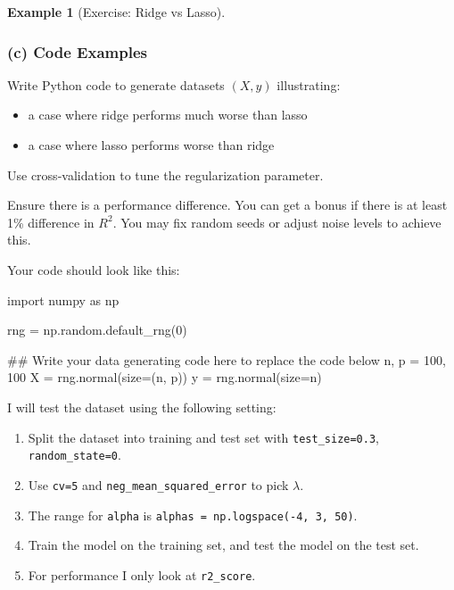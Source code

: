 \documentclass[
  english,
]{article}
\newenvironment{Shaded}{\begin{snugshade}}{\end{snugshade}}
\newcommand{\CommentTok}[1]{\textcolor[rgb]{0.37,0.37,0.37}{#1}}
\newcommand{\DecValTok}[1]{\textcolor[rgb]{0.68,0.00,0.00}{#1}}
\newcommand{\ImportTok}[1]{\textcolor[rgb]{0.00,0.46,0.62}{#1}}
\newcommand{\NormalTok}[1]{\textcolor[rgb]{0.00,0.23,0.31}{#1}}
\newcommand{\OperatorTok}[1]{\textcolor[rgb]{0.37,0.37,0.37}{#1}}
\providecommand{\tightlist}{%
  \setlength{\itemsep}{0pt}\setlength{\parskip}{0pt}}
\theoremstyle{definition}
\newtheorem{example}{Example}[section]
\theoremstyle{definition}
\theoremstyle{remark}
\begin{document}
\begin{example}[Exercise: Ridge vs
Lasso]
\subsubsection{(c) Code Examples}\label{c-code-examples}

Write Python code to generate datasets \((X, y)\) illustrating:

\begin{itemize}
\tightlist
\item
  a case where ridge performs much worse than lasso
\item
  a case where lasso performs worse than ridge
\end{itemize}

Use cross-validation to tune the regularization parameter.

Ensure there is a performance difference. You can get a bonus if there
is at least 1\% difference in \(R^2\). You may fix random seeds or
adjust noise levels to achieve this.

Your code should look like this:

\begin{Shaded}
\begin{Highlighting}[]
\ImportTok{import}\NormalTok{ numpy }\ImportTok{as}\NormalTok{ np}

\NormalTok{rng }\OperatorTok{=}\NormalTok{ np.random.default\_rng(}\DecValTok{0}\NormalTok{)}

\CommentTok{\#\# Write your data generating code here to replace the code below}
\NormalTok{n, p }\OperatorTok{=} \DecValTok{100}\NormalTok{, }\DecValTok{100}
\NormalTok{X }\OperatorTok{=}\NormalTok{ rng.normal(size}\OperatorTok{=}\NormalTok{(n, p))}
\NormalTok{y }\OperatorTok{=}\NormalTok{ rng.normal(size}\OperatorTok{=}\NormalTok{n)}
\end{Highlighting}
\end{Shaded}

I will test the dataset using the following setting:

\begin{enumerate}
\def\labelenumi{\arabic{enumi}.}
\tightlist
\item
  Split the dataset into training and test set with
  \texttt{test\_size=0.3}, \texttt{random\_state=0}.
\item
  Use \texttt{cv=5} and \texttt{neg\_mean\_squared\_error} to pick
  \(\lambda\).
\item
  The range for \texttt{alpha} is
  \texttt{alphas\ =\ np.logspace(-4,\ 3,\ 50)}.
\item
  Train the model on the training set, and test the model on the test
  set.
\item
  For performance I only look at \texttt{r2\_score}.
\end{enumerate}

\end{example}
\end{document}
